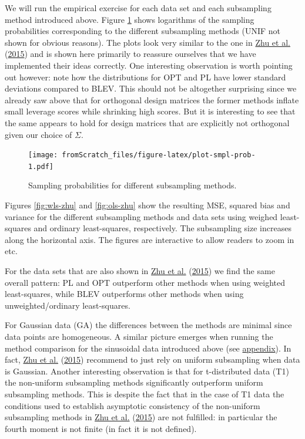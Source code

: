\documentclass[
]{book}
\begin{document}
We will run the empirical exercise for each data set and each subsampling method introduced above. Figure \ref{fig:plot-smpl-prob} shows logarithms of the sampling probabilities corresponding to the different subsampling methods (UNIF not shown for obvious reasons). The plots look very similar to the one in \protect\hyperlink{ref-zhu2015optimal}{Zhu et al.} (\protect\hyperlink{ref-zhu2015optimal}{2015}) and is shown here primarily to reassure ourselves that we have implemented their ideas correctly. One interesting observation is worth pointing out however: note how the distributions for OPT and PL have lower standard deviations compared to BLEV. This should not be altogether surprising since we already saw above that for orthogonal design matrices the former methods inflate small leverage scores while shrinking high scores. But it is interesting to see that the same appears to hold for design matrices that are explicitly not orthogonal given our choice of \(\Sigma\).

\begin{figure}
\centering
\texttt{[image: fromScratch\_files/figure-latex/plot-smpl-prob-1.pdf]}
\caption{\label{fig:plot-smpl-prob}Sampling probabilities for different subsampling methods.}
\end{figure}

Figures \ref{fig:wls-zhu} and \ref{fig:ols-zhu} show the resulting MSE, squared bias and variance for the different subsampling methods and data sets using weighed least-squares and ordinary least-squares, respectively. The subsampling size increases along the horizontal axis. The figures are interactive to allow readers to zoom in etc.

For the data sets that are also shown in \protect\hyperlink{ref-zhu2015optimal}{Zhu et al.} (\protect\hyperlink{ref-zhu2015optimal}{2015}) we find the same overall pattern: PL and OPT outperform other methods when using weighted least-squares, while BLEV outperforms other methods when using unweighted/ordinary least-squares.

For Gaussian data (GA) the differences between the methods are minimal since data points are homogeneous. A similar picture emerges when running the method comparison for the sinusoidal data introduced above (see \protect\hyperlink{app-sin}{appendix}). In fact, \protect\hyperlink{ref-zhu2015optimal}{Zhu et al.} (\protect\hyperlink{ref-zhu2015optimal}{2015}) recommend to just rely on uniform subsampling when data is Gaussian. Another interesting observation is that for t-distributed data (T1) the non-uniform subsampling methods significantly outperform uniform subsampling methods. This is despite the fact that in the case of T1 data the conditions used to establish asymptotic consistency of the non-uniform subsampling methods in \protect\hyperlink{ref-zhu2015optimal}{Zhu et al.} (\protect\hyperlink{ref-zhu2015optimal}{2015}) are not fulfilled: in particular the fourth moment is not finite (in fact it is not defined).
\end{document}
